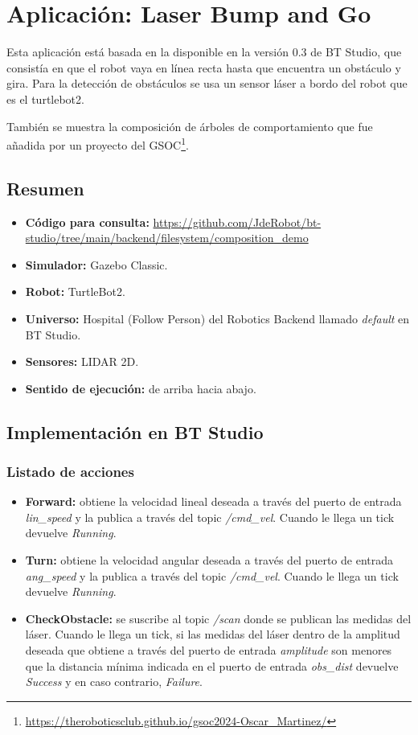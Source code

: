 \section{Aplicación: Laser Bump and Go}

Esta aplicación está basada en la disponible en la versión 0.3 de BT Studio, que consistía en que el robot vaya en línea recta hasta que encuentra un obstáculo y gira. Para la detección de obstáculos se usa un sensor láser a bordo del robot que es el turtlebot2.

También se muestra la composición de árboles de comportamiento que fue añadida por un proyecto del GSOC\footnote{\url{https://theroboticsclub.github.io/gsoc2024-Oscar_Martinez/}}.

\subsection{Resumen}

\begin{itemize}
    \item \textbf{Código para consulta:} \url{https://github.com/JdeRobot/bt-studio/tree/main/backend/filesystem/composition_demo}
    \item \textbf{Simulador:} Gazebo Classic.
    \item \textbf{Robot:} TurtleBot2.
    \item \textbf{Universo:} Hospital (Follow Person) del Robotics Backend llamado \textit{default} en BT Studio.
    \item \textbf{Sensores:} LIDAR 2D.
    \item \textbf{Sentido de ejecución:} de arriba hacia abajo. 
\end{itemize}

\subsection{Implementación en BT Studio}

\subsubsection{Listado de acciones}
\begin{itemize}
    \item \textbf{Forward:} obtiene la velocidad lineal deseada a través del puerto de entrada \textit{lin\_speed} y la publica a través del topic \textit{/cmd\_vel}. Cuando le llega un tick devuelve \textit{Running}. 
    \item \textbf{Turn:} obtiene la velocidad angular deseada a través del puerto de entrada \textit{ang\_speed} y la publica a través del topic \textit{/cmd\_vel}. Cuando le llega un tick devuelve \textit{Running}. 
    \item \textbf{CheckObstacle:} se suscribe al topic \textit{/scan} donde se publican las medidas del láser. Cuando le llega un tick, si las medidas del láser dentro de la amplitud deseada que obtiene a través del puerto de entrada \textit{amplitude} son menores que la distancia mínima indicada en el puerto de entrada \textit{obs\_dist} devuelve \textit{Success} y en caso contrario, \textit{Failure}. 
\end{itemize}

